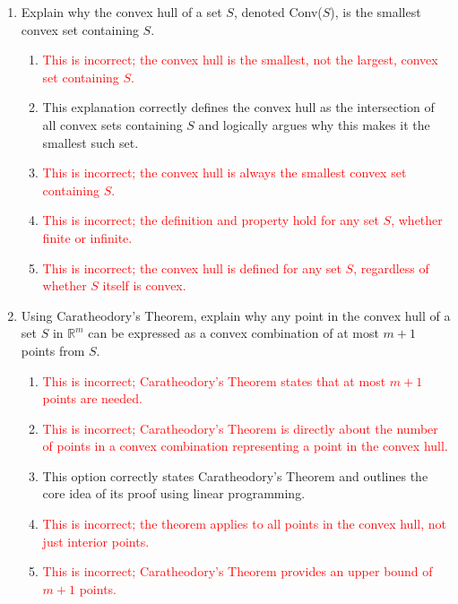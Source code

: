 \documentclass{article}%
\newcommand{\incorrect}[1]{\textcolor{red}{#1}}
\begin{document}
\begin{enumerate}
\begin{enumerate}
\item \incorrect{This statement is false. Boundedness is not a requirement for the intersection of convex sets to be convex.}%
\end{enumerate}%
\vspace{1em}%
\item Explain why the convex hull of a set $S$, denoted Conv($S$), is the smallest convex set containing $S$.%
\begin{enumerate}%
\item \incorrect{This is incorrect; the convex hull is the smallest, not the largest, convex set containing $S$.}%
\item This explanation correctly defines the convex hull as the intersection of all convex sets containing $S$ and logically argues why this makes it the smallest such set.%
\item \incorrect{This is incorrect; the convex hull is always the smallest convex set containing $S$.}%
\item \incorrect{This is incorrect; the definition and property hold for any set $S$, whether finite or infinite.}%
\item \incorrect{This is incorrect; the convex hull is defined for any set $S$, regardless of whether $S$ itself is convex.}%
\end{enumerate}%
\vspace{1em}%
\item Using Caratheodory's Theorem, explain why any point in the convex hull of a set $S$ in $\mathbb{R}^m$ can be expressed as a convex combination of at most $m+1$ points from $S$.%
\begin{enumerate}%
\item \incorrect{This is incorrect; Caratheodory's Theorem states that at most $m+1$ points are needed.}%
\item \incorrect{This is incorrect; Caratheodory's Theorem is directly about the number of points in a convex combination representing a point in the convex hull.}%
\item This option correctly states Caratheodory's Theorem and outlines the core idea of its proof using linear programming.%
\item \incorrect{This is incorrect; the theorem applies to all points in the convex hull, not just interior points.}%
\item \incorrect{This is incorrect; Caratheodory's Theorem provides an upper bound of $m+1$ points.}%
\end{enumerate}%
\vspace{1em}%

\end{enumerate}
\end{document}
